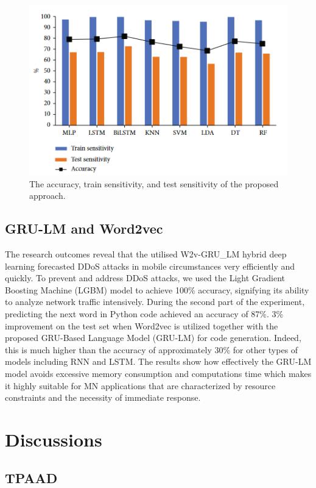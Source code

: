 \documentclass[a4paper, 12pt]{article}
\begin{document}
\begin{figure}[H]
    \centering
    \includegraphics[width=0.7\linewidth]{image-mlddos.png}
    \caption{The accuracy, train sensitivity, and test sensitivity of the proposed approach. \protect{}}
    \label{fig:mlddos}
\end{figure}

\subsection{GRU-LM and Word2vec}

The research outcomes reveal that the utilised W2v-GRU\_LM hybrid deep learning forecasted DDoS attacks in mobile circumstances very efficiently and quickly. To prevent and address DDoS attacks, we used the Light Gradient Boosting Machine (LGBM) model to achieve 100\% accuracy, signifying its ability to analyze network traffic intensively. During the second part of the experiment, predicting the next word in Python code achieved an accuracy of 87\%. 3\% improvement on the test set when Word2vec is utilized together with the proposed GRU-Based Language Model (GRU-LM) for code generation. Indeed, this is much higher than the accuracy of approximately 30\% for other types of models including RNN and LSTM. The results show how effectively the GRU-LM model avoids excessive memory consumption and computations time which makes it highly suitable for MN applications that are characterized by resource constraints and the necessity of immediate response. 

\clearpage

\section{Discussions}
\subsection{TPAAD}
\end{document}
